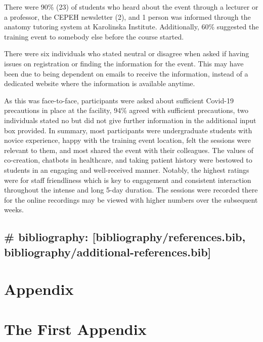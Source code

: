 \documentclass[a4paper, nobind]{templates/ociamthesis}
\begin{document}
There were 90\% (23) of students who heard about the event through a lecturer or a professor, the CEPEH newsletter (2), and 1 person was informed through the anatomy tutoring system at Karolinska Institute. Additionally, 60\% suggested the training event to somebody else before the course started.

There were six individuals who stated neutral or disagree when asked if having issues on registration or finding the information for the event. This may have been due to being dependent on emails to receive the information, instead of a dedicated website where the information is available anytime.

As this was face-to-face, participants were asked about sufficient Covid-19 precautions in place at the facility, 94\% agreed with sufficient precautions, two individuals stated no but did not give further information in the additional input box provided.
In summary, most participants were undergraduate students with novice experience, happy with the training event location, felt the sessions were relevant to them, and most shared the event with their colleagues. The values of co-creation, chatbots in healthcare, and taking patient history were bestowed to students in an engaging and well-received manner. Notably, the highest ratings were for staff friendliness which is key to engagement and consistent interaction throughout the intense and long 5-day duration. The sessions were recorded there for the online recordings may be viewed with higher numbers over the subsequent weeks.

\hypertarget{bibliography-bibliographyreferences.bib-bibliographyadditional-references.bib}{%
\section{\# bibliography: {[}bibliography/references.bib, bibliography/additional-references.bib{]}}\label{bibliography-bibliographyreferences.bib-bibliographyadditional-references.bib}}





\hypertarget{appendix}{%
\chapter*{Appendix}\label{appendix}}

\startappendices

\hypertarget{the-first-appendix}{%
\chapter{The First Appendix}\label{the-first-appendix}}
\end{document}
